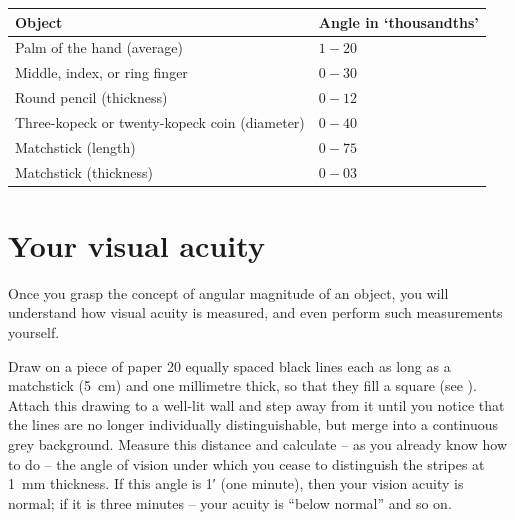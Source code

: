 \begin{small}
\begin{tabular}{p{5cm}p{1.75cm}}
\toprule
Object & Angle in `thousandths'\\
\midrule 
Palm of the hand (average) & $ 1-20$\\
Middle, index, or ring finger& $ 0-30$\\
Round pencil (thickness)& $0-12$\\
Three-kopeck or twenty-kopeck coin (diameter)&  $0-40$\\
Matchstick (length) & $0-75$\\
Matchstick (thickness) & $0-03$\\
\bottomrule
\end{tabular}
\end{small}


\section{Your visual acuity}
\label{sec-3.11}

Once you grasp the concept of angular magnitude of an object, you will understand how visual acuity is measured, and even perform such measurements yourself.

Draw on a piece of paper 20 equally spaced black lines each as long as a matchstick (\SI{5}{\centi\meter}) and one millimetre thick, so that they fill a square (see ). Attach this drawing to a well-lit wall and step away from it until you notice that the lines are no longer individually distinguishable, but merge into a continuous grey background. Measure this distance and calculate -- as you already know how to do -- the angle of vision under which you cease to distinguish the stripes at \SI{1}{\milli\meter} thickness. If this angle is \ang{;1} (one minute), then your vision acuity is normal; if it is three minutes -- your acuity is ``below normal'' and so on.

